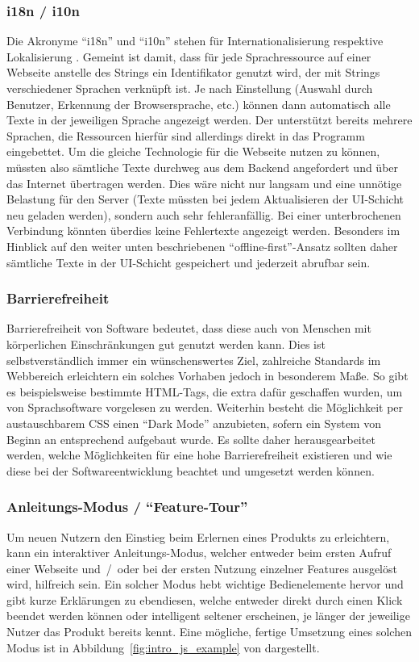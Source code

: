 \subsubsection{i18n / i10n}
Die Akronyme ``i18n'' und ``i10n'' stehen für Internationalisierung respektive Lokalisierung \parencite{i18n_i10n_ishida_w3c_miller_boeing_2018}. Gemeint ist damit, dass für jede Sprachressource auf einer Webseite anstelle des Strings ein Identifikator genutzt wird, der mit Strings verschiedener Sprachen verknüpft ist. Je nach Einstellung (Auswahl durch Benutzer, Erkennung der Browsersprache, etc.) können dann automatisch alle Texte in der jeweiligen Sprache angezeigt werden. Der  unterstützt bereits mehrere Sprachen, die Ressourcen hierfür sind allerdings direkt in das Programm eingebettet. Um die gleiche Technologie für die Webseite nutzen zu können, müssten also sämtliche Texte durchweg aus dem Backend angefordert und über das Internet übertragen werden. Dies wäre nicht nur langsam und eine unnötige Belastung für den Server (Texte müssten bei jedem Aktualisieren der UI-Schicht neu geladen werden), sondern auch sehr fehleranfällig. Bei einer unterbrochenen Verbindung könnten überdies keine Fehlertexte angezeigt werden. Besonders im Hinblick auf den weiter unten beschriebenen ``offline-first''-Ansatz sollten daher sämtliche Texte in der UI-Schicht gespeichert und jederzeit abrufbar sein.

\subsubsection{Barrierefreiheit}
Barrierefreiheit von Software bedeutet, dass diese auch von Menschen mit körperlichen Einschränkungen gut genutzt werden kann. Dies ist selbstverständlich immer ein wünschenswertes Ziel, zahlreiche Standards im Webbereich erleichtern ein solches Vorhaben jedoch in besonderem Maße. So gibt es beispielsweise bestimmte HTML-Tags, die extra dafür geschaffen wurden, um von Sprachsoftware vorgelesen zu werden. Weiterhin besteht die Möglichkeit per austauschbarem CSS einen ``Dark Mode'' anzubieten, sofern ein System von Beginn an entsprechend aufgebaut wurde.
Es sollte daher herausgearbeitet werden, welche Möglichkeiten für eine hohe Barrierefreiheit existieren und wie diese bei der Softwareentwicklung beachtet und umgesetzt werden können.

\subsubsection{Anleitungs-Modus / ``Feature-Tour''}
 Um neuen Nutzern den Einstieg beim Erlernen eines Produkts zu erleichtern, kann ein interaktiver Anleitungs-Modus, welcher entweder beim ersten Aufruf einer Webseite und~/~oder bei der ersten Nutzung einzelner Features ausgelöst wird, hilfreich sein. Ein solcher Modus hebt wichtige Bedienelemente hervor und gibt kurze Erklärungen zu ebendiesen, welche entweder direkt durch einen Klick beendet werden können oder intelligent seltener erscheinen, je länger der jeweilige Nutzer das Produkt bereits kennt. Eine mögliche, fertige Umsetzung eines solchen Modus ist in Abbildung~\ref{fig:intro_js_example} von  dargestellt.

